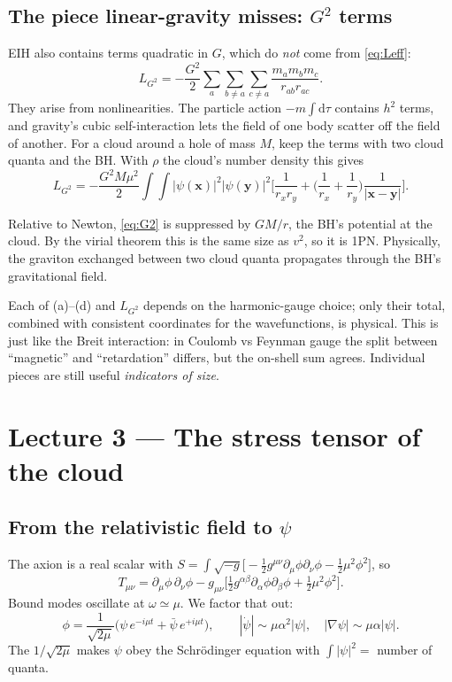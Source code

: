 \documentclass[11pt]{article}
\newcommand{\bx}{\mathbf{x}}\newcommand{\by}{\mathbf{y}}\newcommand{\bv}{\mathbf{v}}
\newcommand{\dd}{\mathrm{d}}
\begin{document}
\subsection{The piece linear-gravity misses: $G^2$ terms}
EIH also contains terms quadratic in $G$, which do \emph{not} come from \eqref{eq:Leff}:
\[
L_{G^2}=-\frac{G^2}{2}\sum_a\sum_{b\neq a}\sum_{c\neq a}\frac{m_am_bm_c}{r_{ab}r_{ac}}.
\]
They arise from nonlinearities. The particle action $-m\int\dd\tau$ contains $h^2$ terms, and gravity's cubic self-interaction lets the field of one body scatter off the field of another. For a cloud around a hole of mass $M$, keep the terms with two cloud quanta and the BH. With $\rho$ the cloud's number density this gives
\begin{equation}
L_{G^2}=-\frac{G^2M\mu^2}{2}\int\!\!\int|\psi(\bx)|^2|\psi(\by)|^2\Big[\frac{1}{r_xr_y}+\Big(\frac1{r_x}+\frac1{r_y}\Big)\frac{1}{|\bx-\by|}\Big].
\label{eq:G2}
\end{equation}
\begin{idea}
Relative to Newton, \eqref{eq:G2} is suppressed by $GM/r$, the BH's potential at the cloud. By the virial theorem this is the same size as $v^2$, so it is 1PN. Physically, the graviton exchanged between two cloud quanta propagates through the BH's gravitational field.
\end{idea}
\begin{idea}
Each of (a)--(d) and $L_{G^2}$ depends on the harmonic-gauge choice; only their total, combined with consistent coordinates for the wavefunctions, is physical. This is just like the Breit interaction: in Coulomb vs Feynman gauge the split between ``magnetic'' and ``retardation'' differs, but the on-shell sum agrees. Individual pieces are still useful \emph{indicators of size}.
\end{idea}

\section{Lecture 3 --- The stress tensor of the cloud}

\subsection{From the relativistic field to $\psi$}
The axion is a real scalar with $S=\int\sqrt{-g}\big[-\tfrac12g^{\mu\nu}\partial_\mu\phi\partial_\nu\phi-\tfrac12\mu^2\phi^2\big]$, so
\[
T_{\mu\nu}=\partial_\mu\phi\,\partial_\nu\phi-g_{\mu\nu}\Big[\tfrac12g^{\alpha\beta}\partial_\alpha\phi\partial_\beta\phi+\tfrac12\mu^2\phi^2\Big].
\]
Bound modes oscillate at $\omega\simeq\mu$. We factor that out:
\[
\phi=\frac{1}{\sqrt{2\mu}}\big(\psi\,e^{-i\mu t}+\bar\psi\,e^{+i\mu t}\big),\qquad
|\dot\psi|\sim\mu\alpha^2|\psi|,\quad|\nabla\psi|\sim\mu\alpha|\psi|.
\]
The $1/\sqrt{2\mu}$ makes $\psi$ obey the Schr\"odinger equation with $\int|\psi|^2=$ number of quanta.
\end{document}
